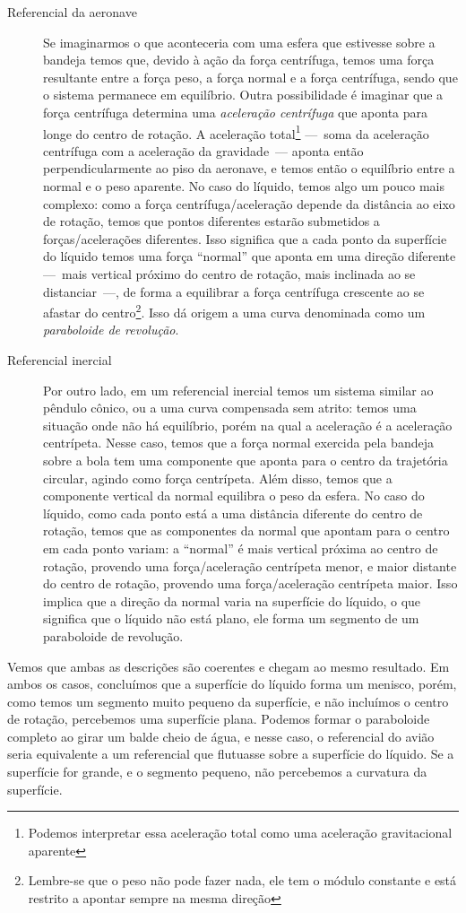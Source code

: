 \begin{description}
    \item[Referencial da aeronave] Se imaginarmos o que aconteceria com uma esfera que estivesse sobre a bandeja temos que, devido à ação da força centrífuga, temos uma força resultante entre a força peso, a força normal e a força centrífuga, sendo que o sistema permanece em equilíbrio. Outra possibilidade é imaginar que a força centrífuga determina uma \emph{aceleração centrífuga} que aponta para longe do centro de rotação. A aceleração total\footnote{Podemos interpretar essa aceleração total como uma aceleração gravitacional aparente} ---~soma da aceleração centrífuga com a aceleração da gravidade~--- aponta então perpendicularmente ao piso da aeronave, e temos então o equilíbrio entre a normal e o peso aparente. No caso do líquido, temos algo um pouco mais complexo: como a força centrífuga/aceleração depende da distância ao eixo de rotação, temos que pontos diferentes estarão submetidos a forças/acelerações diferentes. Isso significa que a cada ponto da superfície do líquido temos uma força ``normal'' que aponta em uma direção diferente ---~mais vertical próximo do centro de rotação, mais inclinada ao se distanciar~---, de forma a equilibrar a força centrífuga crescente ao se afastar do centro\footnote{Lembre-se que o peso não pode fazer nada, ele tem o módulo constante e está restrito a apontar sempre na mesma direção}. Isso dá origem a uma curva denominada como um \emph{paraboloide de revolução}.

    \item[Referencial inercial] Por outro lado, em um referencial inercial temos um sistema similar ao pêndulo cônico, ou a uma curva compensada sem atrito: temos uma situação onde não há equilíbrio, porém na qual a aceleração é a aceleração centrípeta. Nesse caso, temos que a força normal exercida pela bandeja sobre a bola tem uma componente que aponta para o centro da trajetória circular, agindo como força centrípeta. Além disso, temos que a componente vertical da normal equilibra o peso da esfera. No caso do líquido, como cada ponto está a uma distância diferente do centro de rotação, temos que as componentes da normal que apontam para o centro em cada ponto variam: a ``normal'' é mais vertical próxima ao centro de rotação, provendo uma força/aceleração centrípeta menor, e maior distante do centro de rotação, provendo uma força/aceleração centrípeta maior. Isso implica que a direção da normal varia na superfície do líquido, o que significa que o líquido não está plano, ele forma um segmento de um paraboloide de revolução.
\end{description}
%
Vemos que ambas as descrições são coerentes e chegam ao mesmo resultado. Em ambos os casos, concluímos que a superfície do líquido forma um menisco, porém, como temos um segmento muito pequeno da superfície, e não incluímos o centro de rotação, percebemos uma superfície plana. Podemos formar o paraboloide completo ao girar um balde cheio de água, e nesse caso, o referencial do avião seria equivalente a um referencial que flutuasse sobre a superfície do líquido. Se a superfície for grande, e o segmento pequeno, não percebemos a curvatura da superfície.

